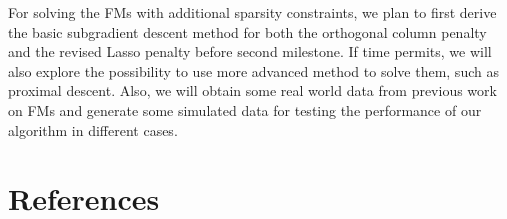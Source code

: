 \documentclass{article}
\begin{document}

For solving the FMs with additional sparsity constraints, we plan to first derive the basic subgradient descent method for both the orthogonal column penalty and the revised Lasso penalty before second milestone. If time permits, we will also explore the possibility to use more advanced method to solve them, such as proximal descent. Also, we will obtain some real world data from previous work on FMs and generate some simulated data for testing the performance of our algorithm in different cases.

\section*{References}
\small{
\renewcommand{\section}[2]{}%
 

}
\end{document}
